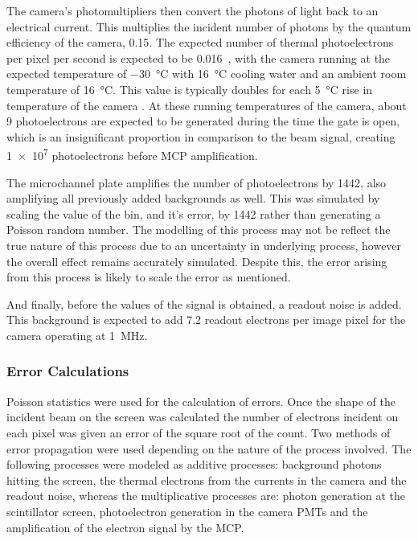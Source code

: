 The camera's photomultipliers then convert the photons of light back to an
electrical current. This multiplies the incident number of photons by the
quantum efficiency of the camera, \num{0.15}.  The expected number of thermal
photoelectrons per pixel per second is expected to be
\num{0.016}~\cite{istarscmos}, with the camera running at the expected
temperature of \SI{-30}{\celsius} with \SI{16}{\celsius} cooling water and an
ambient room temperature of \SI{16}{\celsius}. This value is typically doubles
for each \SI{5}{\celsius} rise in temperature of the camera \cite{istarscmos}.
At these running temperatures of the camera, about 9 photoelectrons are expected
to be generated during the time the gate is open, which is an insignificant
proportion in comparison to the beam signal, creating \num{1e7} photoelectrons
before MCP amplification.

The microchannel plate amplifies the number of photoelectrons by \num{1442},
also amplifying all previously added backgrounds as well. This was simulated by
scaling the value of the bin, and it's error, by \num{1442} rather than
generating a Poisson random number. The modelling of this process may not be
reflect the true nature of this process due to an uncertainty in underlying
process, however the overall effect remains accurately simulated. Despite this,
the error arising from this process is likely to scale the error as mentioned.

And finally, before the values of the signal is obtained, a readout noise is
added. This background is expected to add \num{7.2} readout electrons per image
pixel for the camera operating at \SI{1}{\mega\hertz}.

\subsubsection{Error Calculations}

Poisson statistics were used for the calculation of errors.  Once the shape of
the incident beam on the screen was calculated the number of electrons incident
on each pixel was given an error of the square root of the count. Two methods of
error propagation were used depending on the nature of the process involved.
The following processes were modeled as additive processes: background photons
hitting the screen, the thermal electrons from the currents in the camera and
the readout noise, whereas the multiplicative processes are: photon generation
at the scintillator screen, photoelectron generation in the camera PMTs and the
amplification of the electron signal by the MCP.

